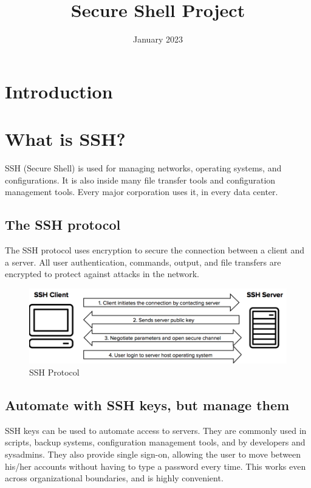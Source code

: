 \documentclass{article}
\title{Secure Shell Project}
\author{}
\date{January 2023}
\begin{document}
\maketitle

\section{Introduction}


\section{What is SSH?}
SSH (Secure Shell) is used for managing networks, operating systems, and configurations. It is also inside many file transfer tools and configuration management tools. Every major corporation uses it, in every data center.

\subsection{The SSH protocol}
The SSH protocol uses encryption to secure the connection between a client and a server. All user authentication, commands, output, and file transfers are encrypted to protect against attacks in the network. 

\begin{figure}[!h]
    \centering
    \includegraphics[width=1 \textwidth]{ssh protocol.png}
    \caption{SSH Protocol}
\end{figure}


\subsection{Automate with SSH keys, but manage them}
SSH keys can be used to automate access to servers. They are commonly used in scripts, backup systems, configuration management tools, and by developers and sysadmins. They also provide single sign-on, allowing the user to move between his/her accounts without having to type a password every time. This works even across organizational boundaries, and is highly convenient.
\end{document}
